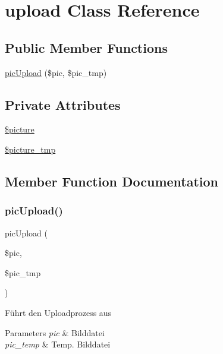 \hypertarget{classupload}{}\section{upload Class Reference}
\label{classupload}
\subsection*{Public Member Functions}
\begin{DoxyCompactItemize}
\item 
\mbox{\hyperlink{classupload_a796b3e6039b5d9c6147ee093d3a21321}{pic\+Upload}} (\$pic, \$pic\+\_\+tmp)
\end{DoxyCompactItemize}
\subsection*{Private Attributes}
\begin{DoxyCompactItemize}
\item 
\mbox{\hyperlink{classupload_a6ed313adb3a8ef1daf8fafdc842b09d1}{\$picture}}
\item 
\mbox{\hyperlink{classupload_a8dcb5c9f4fe43401d44aa63ffa3f482b}{\$picture\+\_\+tmp}}
\end{DoxyCompactItemize}


\subsection{Member Function Documentation}
\mbox{\label{classupload_a796b3e6039b5d9c6147ee093d3a21321}} 
\subsubsection{\texorpdfstring{picUpload()}{picUpload()}}
{\footnotesize\ttfamily pic\+Upload (\begin{DoxyParamCaption}\item[{}]{\$pic,  }\item[{}]{\$pic\+\_\+tmp }\end{DoxyParamCaption})}

Führt den Uploadprozess aus 
\begin{DoxyParams}{Parameters}
{\em pic} & Bilddatei \\
\hline
{\em pic\+\_\+temp} & Temp. Bilddatei \\
\hline
\end{DoxyParams}


